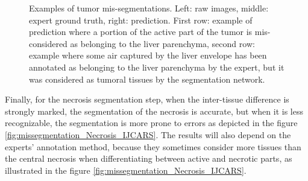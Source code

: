 \begin{figure}[!ht]
\begin{minipage}{4cm}
	\end{minipage} 
	\caption{Examples of tumor mis-segmentations. Left: raw images, middle: expert ground truth, right: prediction. First row: example of prediction where a portion of the active part of the tumor is mis-considered as belonging to the liver parenchyma, second row: example where some air captured by the liver envelope has been annotated as belonging to the liver parenchyma by the expert, but it was considered as tumoral tissues by the segmentation network.}
	\label{fig:missegmentation_Tumor_IJCARS}
\end{figure}

Finally, for the necrosis segmentation step, when the inter-tissue difference is strongly marked, the segmentation of the necrosis is accurate, but when it is less recognizable, the segmentation is more prone to errors as depicted in the figure \ref{fig:missegmentation_Necrosis_IJCARS}. The results will also depend on the experts' annotation method, because they sometimes consider more tissues than the central necrosis when differentiating between active and necrotic parts, as illustrated in the figure \ref{fig:missegmentation_Necrosis_IJCARS}.

